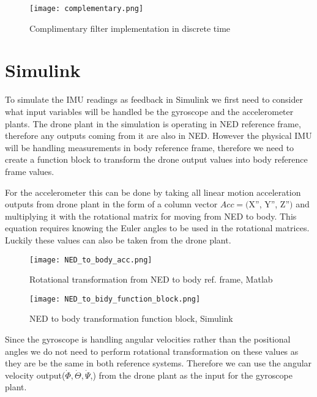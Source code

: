 \documentclass{article}
\begin{document}
\begin{figure}[H]
    \begin{center}
    \texttt{[image: complementary.png]}
    \end{center}
    \caption{Complimentary filter implementation in discrete time}
    \label{fig:my_label}
\end{figure}

\section{Simulink}
\begin{flushleft}
To simulate the IMU readings as feedback in Simulink we first need to consider what input variables will be handled be the gyroscope and the accelerometer plants. The drone plant in the simulation is operating in NED reference frame, therefore any outputs coming from it are also in NED. However the physical IMU will be handling measurements in body reference frame, therefore we need to create a function block to transform the drone output values into body reference frame values. 

For the accelerometer this can be done by taking all linear motion acceleration outputs from drone plant in the form of a column vector $Acc=($X'', Y'', Z''$)$ and multiplying it with the rotational matrix for moving from NED to body. This equation requires knowing the Euler angles to be used in the rotational matrices. Luckily these values can also be taken from the drone plant.


\begin{figure}[H]
    \begin{center}
    \texttt{[image: NED\_to\_body\_acc.png]}
    \end{center}
    \caption{Rotational transformation from NED to body ref. frame, Matlab}
    \label{fig:my_label}
\end{figure}

\begin{figure}[H]
    \begin{center}
    \texttt{[image: NED\_to\_bidy\_function\_block.png]}
    \end{center}
    \caption{NED to body transformation function block, Simulink}
    \label{fig:my_label}
\end{figure}

Since the gyroscope is handling angular velocities rather than the positional angles we do not need to perform rotational transformation on these values as they are be the same in both reference systems. Therefore we can use the angular velocity output($\dot{\Phi}, \dot{\Theta}, \dot{\Psi}$,) from the drone plant as the input for the gyroscope plant. 


\end{flushleft}
\end{document}
